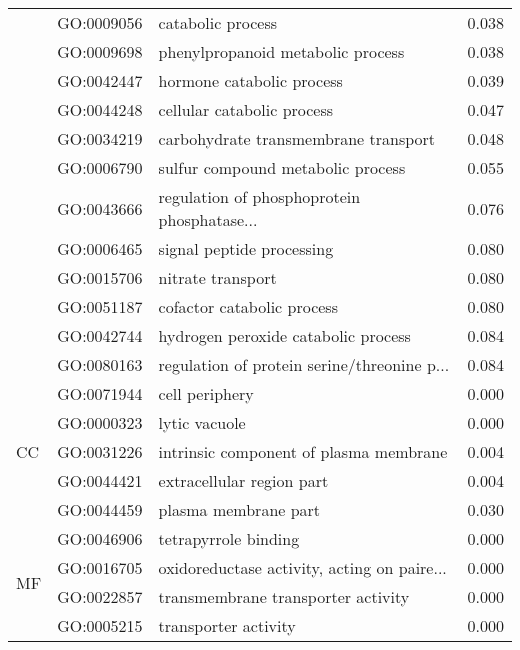 \begin{longtable}{lllr}
   & GO:0009056 &                            catabolic process &         0.038 \\
   & GO:0009698 &            phenylpropanoid metabolic process &         0.038 \\
   & GO:0042447 &                    hormone catabolic process &         0.039 \\
   & GO:0044248 &                   cellular catabolic process &         0.047 \\
   & GO:0034219 &         carbohydrate transmembrane transport &         0.048 \\
   & GO:0006790 &            sulfur compound metabolic process &         0.055 \\
   & GO:0043666 &  regulation of phosphoprotein phosphatase... &         0.076 \\
   & GO:0006465 &                    signal peptide processing &         0.080 \\
   & GO:0015706 &                            nitrate transport &         0.080 \\
   & GO:0051187 &                   cofactor catabolic process &         0.080 \\
   & GO:0042744 &          hydrogen peroxide catabolic process &         0.084 \\
   & GO:0080163 &  regulation of protein serine/threonine p... &         0.084 \\
\cline{1-4}
\multirow{5}{*}{CC} & GO:0071944 &                               cell periphery &         0.000 \\
   & GO:0000323 &                                lytic vacuole &         0.000 \\
   & GO:0031226 &       intrinsic component of plasma membrane &         0.004 \\
   & GO:0044421 &                    extracellular region part &         0.004 \\
   & GO:0044459 &                         plasma membrane part &         0.030 \\
\cline{1-4}
\multirow{73}{*}{MF} & GO:0046906 &                         tetrapyrrole binding &         0.000 \\
   & GO:0016705 &  oxidoreductase activity, acting on paire... &         0.000 \\
   & GO:0022857 &           transmembrane transporter activity &         0.000 \\
   & GO:0005215 &                         transporter activity &         0.000 \\

\end{longtable}
